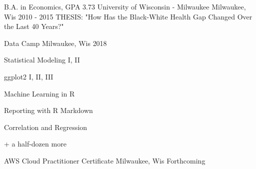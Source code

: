 

\begin{cventries}

  \cventry
    {B.A. in Economics, GPA 3.73} %
    {University of Wisconsin - Milwaukee} %
    {Milwaukee, Wis} %
    {2010 - 2015} %
    {THESIS: "How Has the Black-White Health Gap Changed Over the Last 40 Years?"}
    

\end{cventries}

\begin{cventries}
\cventry
    {} %
    {Data Camp} %
    {Milwaukee, Wis} %
    {2018} %
    {\begin{cvitems} %
        \item {Statistical Modeling I, II}
        \item {ggplot2 I, II, III}
        \item {Machine Learning in R}
        \item {Reporting with R Markdown}
        \item {Correlation and Regression}
        \item {+ a half-dozen more}
      \end{cvitems}
      }
\cventry
    {} %
    {AWS Cloud Practitioner Certificate} %
    {Milwaukee, Wis} %
    {Forthcoming} %
    {}
\end{cventries}


